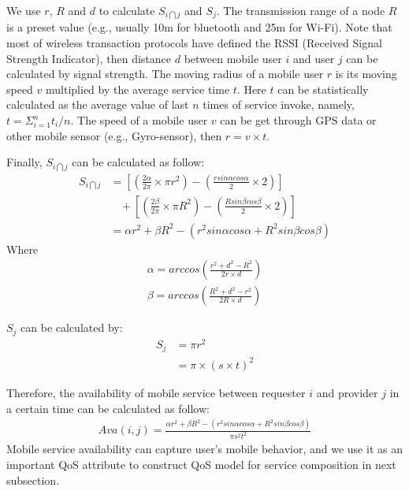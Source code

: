 \documentclass[10pt,journal,compsoc]{IEEEtran}
\begin{document}
We use $r$, $R$ and $d$ to calculate $S_{i \bigcap j}$ and $S_j$. 
The transmission range of a node $R$ is a preset value (e.g., usually 10m for bluetooth and 25m for Wi-Fi). 
Note that most of wireless transaction protocols have defined the RSSI (Received Signal Strength Indicator), then distance $d$ between mobile user $i$ and user $j$ can be calculated by signal strength.  
The moving radius of a mobile user $r$ is its moving speed $v$ multiplied by the average service time $t$. Here $t$ can be statistically calculated as the average value of last $n$ times of service invoke, namely, $t = \Sigma_{i=1}^{n}t_i/n$. The speed of a mobile user $v$ can be get through GPS data or other mobile sensor (e.g., Gyro-sensor), then $r = v \times t$. ​

Finally, $S_{i \bigcap j}$ can be calculated as follow:
\setlength{\arraycolsep}{0.0em}
\begin{align}
S_{i \bigcap j} & =  [(\frac{2\alpha}{2\pi} \times \pi r^2)-(\frac{r sin\alpha cos\alpha}{2} \times 2)]\\\nonumber
& \ \ \ \ +[(\frac{2\beta}{2\pi} \times \pi R^2)-(\frac{R sin\beta cos\beta}{2} \times 2)]\\\nonumber
& = \alpha r^2 + \beta R^2 - (r^2 sin\alpha cos\alpha + R^2 sin\beta cos\beta)
\end{align}
\setlength{\arraycolsep}{5pt}
Where
\begin{eqnarray}
\alpha = arccos(\frac{r^2+d^2-R^2}{2r\times d}) \\\nonumber
\beta = arccos(\frac{R^2+d^2-r^2}{2R\times d})
\end{eqnarray}

$S_j$ can be calculated by:
\begin{align}
S_j & = \pi r^2 \\\nonumber
& = \pi \times (s \times t)^2
\end{align}

Therefore, the availability of mobile service between requester $i$ and provider $j$ in a certain time can be calculated as follow:
\begin{align}
Ava(i,j) = \frac{\alpha r^2 + \beta R^2 - (r^2 sin\alpha cos\alpha + R^2 sin\beta cos\beta)}{\pi s^2 t^2}
\end{align}
Mobile service availability can capture user's mobile behavior, and we use it as an important QoS attribute to construct QoS model for service composition in next subsection.
\end{document}
